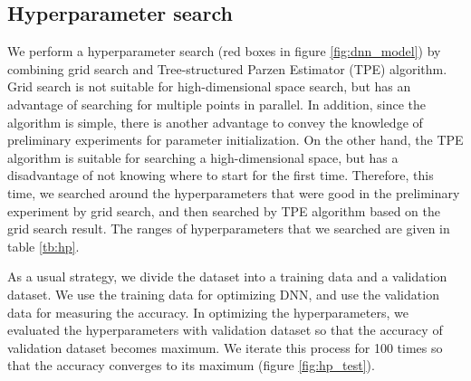 \documentclass[useamsfonts]{pasj01}
\begin{document}
\subsection{Hyperparameter search}\label{hyperparametersearch}
We perform a hyperparameter search (red boxes in figure \ref{fig:dnn_model}) by combining grid search and Tree-structured Parzen Estimator (TPE) algorithm.
Grid search is not suitable for high-dimensional space search, but has an advantage of searching for multiple points in parallel.
In addition, since the algorithm is simple, there is another advantage to convey the knowledge of preliminary experiments for parameter initialization.
On the other hand, the TPE algorithm is suitable for searching a high-dimensional space, but has a disadvantage of not knowing where to start for the first time.
Therefore, this time, we searched around the hyperparameters that were good in the preliminary experiment by grid search, and then searched by TPE algorithm based 
on the grid search result.
The ranges of hyperparameters that we searched are given in table \ref{tb:hp}.

As a usual strategy, we divide the dataset into a training data and a validation dataset.
We use the training data for optimizing DNN, and use the validation data for measuring the accuracy.
In optimizing the hyperparameters, we evaluated the hyperparameters with validation dataset so
that the accuracy of validation dataset becomes maximum.
We iterate this process for 100 times so that the accuracy converges to its maximum (figure \ref{fig:hp_test}).

%
\begin{table}[htbp]
  \label{tb:hp}
\end{table}
\end{document}
